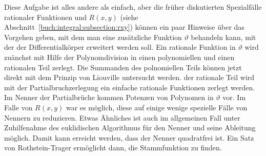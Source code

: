 Diese Aufgabe ist alles andere als einfach, aber die früher diskutierten
Spezialfälle rationaler Funktionen und $R(x,y)$
(siehe Abschnitt~\ref{buch:integral:subsection:rxy}) können ein paar
Hinweise über das Vorgehen geben, mit dem man eine zusätzliche
Funktion $\vartheta$ behandeln kann, mit der der Differentialkörper
erweitert werden soll.
Ein rationale Funktion in $\vartheta$ wird zuänchst mit Hilfe der
Polynomdivision in einen polynomiellen und einen rationalen
Teil zerlegt.
Die Summanden des polnomiellen Teils können jetzt direkt mit
dem Prinzip von Liouville untersucht werden.
der rationale Teil wird mit der Partialbruchzerlegung ein
einfache rationale Funktionen zerlegt werden.
Im Nenner der Partialbrüche kommen Potenzen von Polynomen in $\vartheta$
vor. 
Im Falle von $R(x,y)$ war es möglich, diese auf einige wenige spezielle
Fälle von Nennern zu reduzieren.
Etwas Ähnliches ist auch im allgemeinen Fall unter Zuhilfenahme
des euklidischen Algorithmus für den Nenner und seine Ableitung möglich.
Damit kann erreicht werden, dass der Nenner quadratfrei ist.
Ein Satz von Rothstein-Trager ermöglicht dann, die Stammfunktion zu finden.


